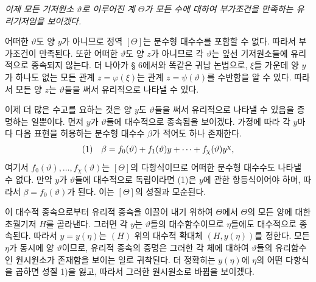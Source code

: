 \emph{이제 모든 기저원소 $\vartheta$로 이루어진 계 $\Theta$가 모든 수에 대하여 부가조건을 만족하는 유리기저임을 보이겠다.}

어떠한 $\vartheta$도 양 $y$가 아니므로 정역 $[\Theta]$는 분수형 대수수를 포함할 수 없다. 따라서 부가조건이 만족된다. 또한 어떠한 $\vartheta$도 양 $z$가 아니므로 각 $\vartheta$는 앞선 기저원소들에 유리적으로 종속되지 않는다. 더 나아가 § 6에서와 똑같은 귀납 논법으로, $\xi$들 가운데 양 $y$가 하나도 없는 모든 관계 $z=\varphi(\xi)$는 관계 $z=\psi(\vartheta)$를 수반함을 알 수 있다. 따라서 모든 양 $z$는 $\vartheta$들을 써서 유리적으로 나타낼 수 있다.

이제 더 많은 수고를 요하는 것은 양 $y$도 $\vartheta$들을 써서 유리적으로 나타낼 수 있음을 증명하는 일뿐이다. 먼저 $y$가 $\vartheta$들에 대수적으로 종속됨을 보이겠다. 가정에 따라 각 $y$마다 다음 표현을 허용하는 분수형 대수수 $\beta$가 적어도 하나 존재한다.
\[
\begin{array}{@{}l@{\quad}c@{}}
(1)& \beta=f_0(\vartheta)+f_1(\vartheta)y+\cdots+f_\chi(\vartheta)y^\chi,
\end{array}
\]
여기서 $f_0(\vartheta),\ldots,f_\chi(\vartheta)$는 $[\Theta]$의 다항식이므로 어떠한 분수형 대수수도 나타낼 수 없다. 만약 $y$가 $\vartheta$들에 대수적으로 독립이라면 (1)은 $y$에 관한 항등식이어야 하며, 따라서 $\beta=f_0(\vartheta)$가 된다. 이는 $[\Theta]$의 성질과 모순된다.

이 대수적 종속으로부터 유리적 종속을 이끌어 내기 위하여 $\Theta$에서 $\Theta$의 모든 양에 대한 초월기저 $H$를 골라낸다. 그러면 각 $y$는 $\vartheta$들의 대수함수이므로 $\eta$들에도 대수적으로 종속된다. 따라서 $y=y(\eta)$는 $(H)$ 위의 대수적 확대체 $(H,y(\eta))$를 정한다. 모든 $\eta$가 동시에 양 $\vartheta$이므로, 유리적 종속의 증명은 그러한 각 체에 대하여 $\vartheta$들의 유리함수인 원시원소가 존재함을 보이는 일로 귀착된다. 더 정확히는 $y(\eta)$에 $\eta$의 어떤 다항식을 곱하면 성질 1)을 잃고, 따라서 그러한 원시원소로 바뀜을 보이겠다.

